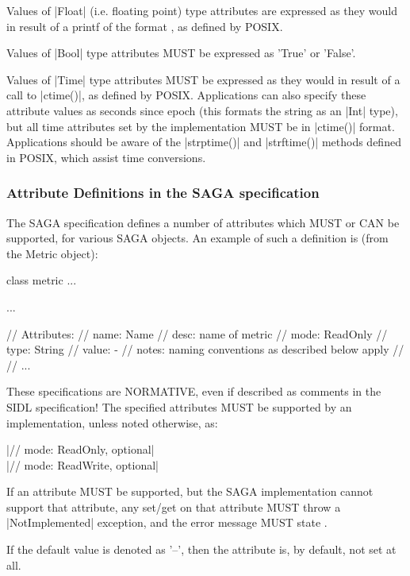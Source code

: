   Values of |Float| (i.e. floating point) type attributes
  are expressed as they would in result of a printf of the
  format , as defined by POSIX.
 
  Values of |Bool| type attributes MUST be expressed as
  'True' or 'False'.
 
  Values of |Time| type attributes MUST be expressed as they
  would in result of a call to |ctime()|, as defined by POSIX.
  Applications can also specify these attribute values as
  seconds since epoch (this formats the string as
  an |Int| type), but all time attributes set by the
  implementation MUST be in |ctime()| format.  Applications
  should be aware of the |strptime()| and |strftime()| methods
  defined in POSIX, which assist time conversions.
 
 
 \subsubsection{Attribute Definitions in the SAGA specification}
 
  The SAGA specification defines a number of attributes which
  MUST or CAN be supported, for various SAGA objects.  An
  example of such a definition is (from the Metric
  object):
 
  \begin{myspectxt}
        class metric ...
        {
          ...
 
          // Attributes:
          //   name:  Name
          //   desc:  name of metric
          //   mode:  ReadOnly
          //   type:  String
          //   value: -
          //   notes: naming conventions as described below apply
          //
          //   ...
        }
  \end{myspectxt}
 
    These specifications are NORMATIVE, even if described as
    comments in the SIDL specification!  The specified
    attributes MUST be supported by an implementation, unless
    noted otherwise, as:
 
    \shift |//  mode:  ReadOnly, optional|\\
    \shift |//  mode:  ReadWrite, optional|
 
    If an attribute MUST be supported, but the SAGA
    implementation cannot support that attribute, any set/get on
    that attribute MUST throw a |NotImplemented| exception, and
    the error message MUST state .
 
    If the default value is denoted as '--', then the
    attribute is, by default, not set at all.
 
